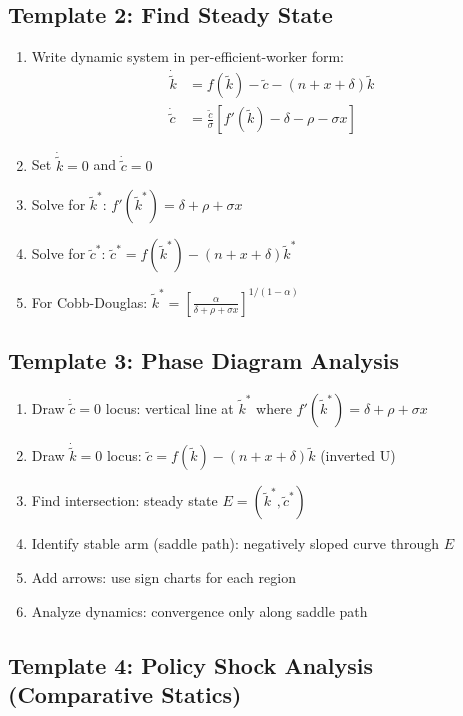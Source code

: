\documentclass[a4paper,11pt]{article}
\newcommand{\ktilde}{\tilde{k}}
\newcommand{\ctilde}{\tilde{c}}
\begin{document}
\subsection*{Template 2: Find Steady State}

\begin{enumerate}
    \item Write dynamic system in per-efficient-worker form:
        \begin{align*}
            \dot{\ktilde} &= f(\ktilde) - \ctilde - (n+x+\delta)\ktilde \\
            \dot{\ctilde} &= \frac{\ctilde}{\sigma}[f'(\ktilde) - \delta - \rho - \sigma x]
        \end{align*}
    \item Set $\dot{\ktilde} = 0$ and $\dot{\ctilde} = 0$
    \item Solve for $\ktilde^*$: $f'(\ktilde^*) = \delta + \rho + \sigma x$
    \item Solve for $\ctilde^*$: $\ctilde^* = f(\ktilde^*) - (n+x+\delta)\ktilde^*$
    \item For Cobb-Douglas: $\ktilde^* = \left[\frac{\alpha}{\delta + \rho + \sigma x}\right]^{1/(1-\alpha)}$
\end{enumerate}

\subsection*{Template 3: Phase Diagram Analysis}

\begin{enumerate}
    \item Draw $\dot{\ctilde} = 0$ locus: vertical line at $\ktilde^*$ where $f'(\ktilde^*) = \delta + \rho + \sigma x$
    \item Draw $\dot{\ktilde} = 0$ locus: $\ctilde = f(\ktilde) - (n+x+\delta)\ktilde$ (inverted U)
    \item Find intersection: steady state $E = (\ktilde^*, \ctilde^*)$
    \item Identify stable arm (saddle path): negatively sloped curve through $E$
    \item Add arrows: use sign charts for each region
    \item Analyze dynamics: convergence only along saddle path
\end{enumerate}

\subsection*{Template 4: Policy Shock Analysis (Comparative Statics)}
\end{document}

